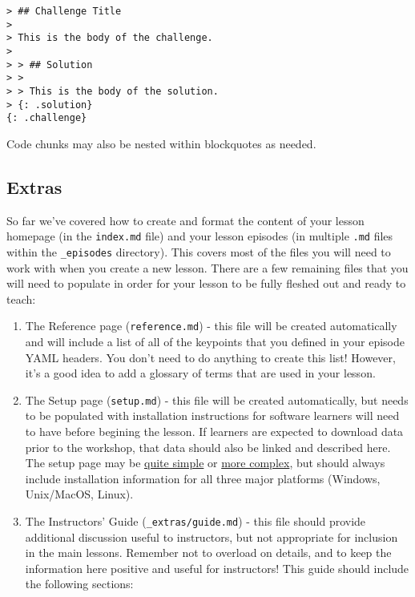 \documentclass[
]{book}
\begin{document}
\begin{verbatim}
> ## Challenge Title
>
> This is the body of the challenge.
>
> > ## Solution
> >
> > This is the body of the solution.
> {: .solution}
{: .challenge}
\end{verbatim}

Code chunks may also be nested within blockquotes as needed.

\hypertarget{extras}{%
\subsection{Extras}\label{extras}}

So far we've covered how to create and format the content of your lesson homepage (in the \texttt{index.md} file)
and your lesson episodes (in multiple \texttt{.md} files within the \texttt{\_episodes} directory). This covers most of the
files you will need to work with when you create a new lesson. There are a few remaining files that you will
need to populate in order for your lesson to be fully fleshed out and ready to teach:

\begin{enumerate}
\def\labelenumi{\arabic{enumi}.}
\item
  The Reference page (\texttt{reference.md}) - this file will be created automatically and will include a list
  of all of the keypoints that you defined in your episode YAML headers. You don't need to do anything to create
  this list! However, it's a good idea to add a glossary of terms that are used in your lesson.
\item
  The Setup page (\texttt{setup.md}) - this file will be created automatically, but needs to be populated with
  installation instructions for software learners will need to have before begining the lesson. If learners are
  expected to download data prior to the workshop, that data should also be linked and described here. The setup
  page may be \href{http://swcarpentry.github.io/git-novice/setup.html}{quite simple} or
  \href{https://datacarpentry.org/geospatial-workshop/setup.html}{more complex}, but should
  always include installation information for all three major platforms (Windows, Unix/MacOS, Linux).
\item
  The Instructors' Guide (\texttt{\_extras/guide.md}) - this file should provide additional discussion useful to
  instructors,
  but not appropriate for inclusion in the main lessons. Remember not to overload on details, and to keep the
  information here positive and useful for instructors! This guide should include the following sections:
\end{enumerate}
\end{document}
